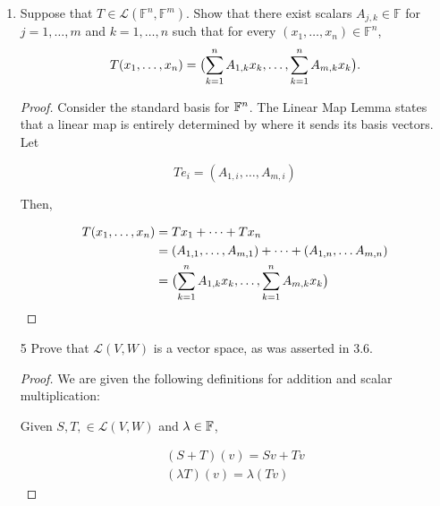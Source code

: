 \begin{enumerate}
\begin{proof}
    Then, we know that linear maps are preserved under addition, scalar multiplication, and function composition, so everything except the terms with $b$ and $c$ are cleared. $bp(1)p(2)$ is not a linear map (when $b \neq 0$) because it does not preserve scalar multiplication. Multiplying $p$ by a constant multiplites $bp(1)p(2)$ by its square. $c\sin p(0)$ clearly violates both addition and multiplication ($\sin$ isn't linear!). So, $b = c = 0$. Since everything else is a linear map, $T$ must be too.
\end{proof}

\item Suppose that $T\in\mathcal L(\mathbb F^n,\mathbb F^m)$. Show that there exist scalars $A_{j,k}\in\mathbb F$ for
\hspace{1em} $j=1,\dots,m$ and $k=1,\dots,n$ such that for every
\hspace{1em} $(x_1,\dots,x_n)\in\mathbb F^n$,
\[
T(x_1,\dots,x_n)=\bigl(\nobreak\sum_{k=1}^n A_{1,k}x_k,\dots,\nobreak\sum_{k=1}^n A_{m,k}x_k\bigr).
\]

\begin{proof}
    Consider the standard basis for $\mathbb{F}^n$. The Linear Map Lemma states that a linear map is entirely determined by where it sends its basis vectors. Let 
    
    $$Te_i = (A_{1, i}, \dots, A_{m, i})$$
    
    Then, 

    \begin{align*}
        T(x_1, \dots, x_n) &= Tx_1 + \dots + Tx_n \\
        &= (A_{1,1}, \dots, A_{m, 1}) + \dots + (A_{1, n}, \dots A_{m, n}) \\
        &= \bigl(\nobreak\sum_{k=1}^n A_{1,k}x_k,\dots,\nobreak\sum_{k=1}^n A_{m,k}x_k\bigr)
    \end{align*}
\end{proof}

\item[5] Prove that $\mathcal L(V, W)$ is a vector space, as was asserted in 3.6.

\begin{proof}
    We are given the following definitions for addition and scalar multiplication:

    Given $S, T, \in \mathcal L(V, W)$ and $ \lambda \in \mathbb{F}$,

    \begin{align*}
        (S + T)(v) = Sv + Tv \\
        (\lambda T)(v) = \lambda(Tv)
    \end{align*}


\end{proof}
\end{enumerate}
